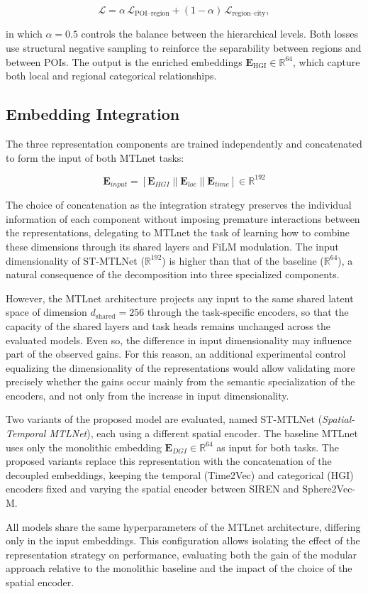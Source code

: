 \[
\mathcal{L}
=
\alpha\,\mathcal{L}_{\text{POI--region}}
+
(1-\alpha)\,\mathcal{L}_{\text{region--city}},
\]

in which $\alpha = 0.5$ controls the balance between the hierarchical levels. Both losses use structural negative sampling to reinforce the separability between regions and between POIs. The output is the enriched embeddings $\mathbf{E}_{\text{HGI}} \in \mathbb{R}^{64}$, which capture both local and regional categorical relationships.

\subsection{Embedding Integration}

The three representation components are trained independently and concatenated to form the input of both MTLnet tasks:

\begin{equation}
\mathbf{E}_{input} = [\mathbf{E}_{HGI} \| \mathbf{E}_{loc} \| \mathbf{E}_{time}] \in \mathbb{R}^{192}
\label{eq:courb:concat}
\end{equation}

The choice of concatenation as the integration strategy preserves the individual information of each component without imposing premature interactions between the representations, delegating to MTLnet the task of learning how to combine these dimensions through its shared layers and FiLM modulation. The input dimensionality of ST-MTLNet ($\mathbb{R}^{192}$) is higher than that of the baseline ($\mathbb{R}^{64}$), a natural consequence of the decomposition into three specialized components.

However, the MTLnet architecture projects any input to the same shared latent space of dimension $d_{\mathrm{shared}} = 256$ through the task-specific encoders, so that the capacity of the shared layers and task heads remains unchanged across the evaluated models. Even so, the difference in input dimensionality may influence part of the observed gains. For this reason, an additional experimental control equalizing the dimensionality of the representations would allow validating more precisely whether the gains occur mainly from the semantic specialization of the encoders, and not only from the increase in input dimensionality.

Two variants of the proposed model are evaluated, named ST-MTLNet (\textit{Spatial-Temporal MTLNet}), each using a different spatial encoder. The baseline MTLnet \cite{silva2025mtlnet} uses only the monolithic embedding $\mathbf{E}_{DGI} \in \mathbb{R}^{64}$ as input for both tasks. The proposed variants replace this representation with the concatenation of the decoupled embeddings, keeping the temporal (Time2Vec) and categorical (HGI) encoders fixed and varying the spatial encoder between SIREN and Sphere2Vec-M.

All models share the same hyperparameters of the MTLnet architecture, differing only in the input embeddings. This configuration allows isolating the effect of the representation strategy on performance, evaluating both the gain of the modular approach relative to the monolithic baseline and the impact of the choice of the spatial encoder.
